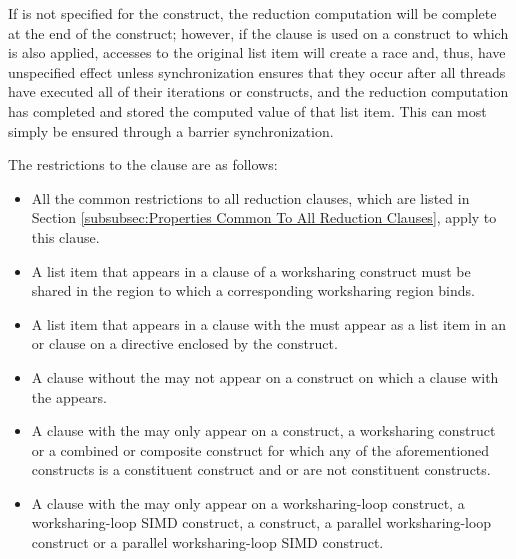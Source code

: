 If  is not specified for the construct, the reduction computation will be complete at the end of the
construct; however, if the  clause is used on a construct to which  is
also applied, accesses to the original list item will create a race and, thus, have
unspecified effect unless synchronization ensures that they occur after all threads have
executed all of their iterations or  constructs, and the reduction computation
has completed and stored the computed value of that list item. This can most simply be
ensured through a barrier synchronization.

\restrictions
The restrictions to the  clause are as follows:

\begin{itemize}
\item All the common restrictions to all reduction clauses, which are listed in
Section \ref{subsubsec:Properties Common To All Reduction Clauses}, apply to
this clause.

\item A list item that appears in a  clause of a worksharing
construct must be shared in the  region to which a corresponding
worksharing region binds.

\item A list item that appears in a  clause with
the   must appear as a list item in an  or
 clause on a  directive enclosed by the
construct.

\item A  clause without the   may not
appear on a construct on which a  clause with the
  appears.

\item A  clause with the  
may only appear on a  construct, a worksharing construct or a
combined or composite construct for which any of the aforementioned constructs is a
constituent construct and  or  are not constituent
constructs.

\item A  clause with the  
may only appear on a worksharing-loop construct, a worksharing-loop SIMD
construct, a  construct, a parallel worksharing-loop construct or
a parallel worksharing-loop SIMD construct.


\end{itemize}
